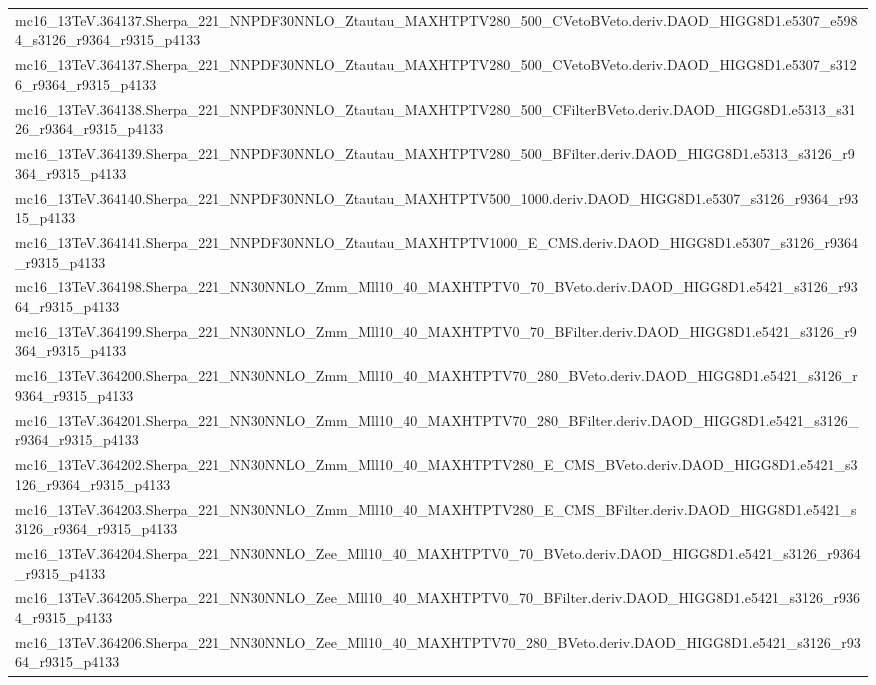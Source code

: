 \begin{adjustwidth}{-3em}{-3em}
\begin{longtable}{l}
mc16\_13TeV.364137.Sherpa\_221\_NNPDF30NNLO\_Ztautau\_MAXHTPTV280\_500\_CVetoBVeto.deriv.DAOD\_HIGG8D1.e5307\_e5984\_s3126\_r9364\_r9315\_p4133 \\
mc16\_13TeV.364137.Sherpa\_221\_NNPDF30NNLO\_Ztautau\_MAXHTPTV280\_500\_CVetoBVeto.deriv.DAOD\_HIGG8D1.e5307\_s3126\_r9364\_r9315\_p4133 \\
mc16\_13TeV.364138.Sherpa\_221\_NNPDF30NNLO\_Ztautau\_MAXHTPTV280\_500\_CFilterBVeto.deriv.DAOD\_HIGG8D1.e5313\_s3126\_r9364\_r9315\_p4133 \\
mc16\_13TeV.364139.Sherpa\_221\_NNPDF30NNLO\_Ztautau\_MAXHTPTV280\_500\_BFilter.deriv.DAOD\_HIGG8D1.e5313\_s3126\_r9364\_r9315\_p4133 \\
mc16\_13TeV.364140.Sherpa\_221\_NNPDF30NNLO\_Ztautau\_MAXHTPTV500\_1000.deriv.DAOD\_HIGG8D1.e5307\_s3126\_r9364\_r9315\_p4133 \\
mc16\_13TeV.364141.Sherpa\_221\_NNPDF30NNLO\_Ztautau\_MAXHTPTV1000\_E\_CMS.deriv.DAOD\_HIGG8D1.e5307\_s3126\_r9364\_r9315\_p4133 \\
mc16\_13TeV.364198.Sherpa\_221\_NN30NNLO\_Zmm\_Mll10\_40\_MAXHTPTV0\_70\_BVeto.deriv.DAOD\_HIGG8D1.e5421\_s3126\_r9364\_r9315\_p4133 \\
mc16\_13TeV.364199.Sherpa\_221\_NN30NNLO\_Zmm\_Mll10\_40\_MAXHTPTV0\_70\_BFilter.deriv.DAOD\_HIGG8D1.e5421\_s3126\_r9364\_r9315\_p4133 \\
mc16\_13TeV.364200.Sherpa\_221\_NN30NNLO\_Zmm\_Mll10\_40\_MAXHTPTV70\_280\_BVeto.deriv.DAOD\_HIGG8D1.e5421\_s3126\_r9364\_r9315\_p4133 \\
mc16\_13TeV.364201.Sherpa\_221\_NN30NNLO\_Zmm\_Mll10\_40\_MAXHTPTV70\_280\_BFilter.deriv.DAOD\_HIGG8D1.e5421\_s3126\_r9364\_r9315\_p4133 \\
mc16\_13TeV.364202.Sherpa\_221\_NN30NNLO\_Zmm\_Mll10\_40\_MAXHTPTV280\_E\_CMS\_BVeto.deriv.DAOD\_HIGG8D1.e5421\_s3126\_r9364\_r9315\_p4133 \\
mc16\_13TeV.364203.Sherpa\_221\_NN30NNLO\_Zmm\_Mll10\_40\_MAXHTPTV280\_E\_CMS\_BFilter.deriv.DAOD\_HIGG8D1.e5421\_s3126\_r9364\_r9315\_p4133 \\
mc16\_13TeV.364204.Sherpa\_221\_NN30NNLO\_Zee\_Mll10\_40\_MAXHTPTV0\_70\_BVeto.deriv.DAOD\_HIGG8D1.e5421\_s3126\_r9364\_r9315\_p4133 \\
mc16\_13TeV.364205.Sherpa\_221\_NN30NNLO\_Zee\_Mll10\_40\_MAXHTPTV0\_70\_BFilter.deriv.DAOD\_HIGG8D1.e5421\_s3126\_r9364\_r9315\_p4133 \\
mc16\_13TeV.364206.Sherpa\_221\_NN30NNLO\_Zee\_Mll10\_40\_MAXHTPTV70\_280\_BVeto.deriv.DAOD\_HIGG8D1.e5421\_s3126\_r9364\_r9315\_p4133 \\

\end{longtable}
\end{adjustwidth}
